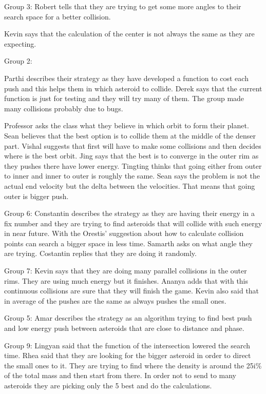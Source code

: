 Group 3:
Robert tells that they are trying to get some more angles to their search space for a better collision.

Kevin says that the calculation of the center is not always the same as they are expecting.

Group 2:

Parthi describes their strategy as they have developed a function to cost each push and this helps them in which asteroid to collide.
Derek says that the current function is just for testing and they will try many of them.
The group made many collisions probably due to bugs.
 
Professor asks the class what they believe in which orbit to form their planet.
Sean believes that the best option is to collide them at the middle of the denser part.
Vishal suggests that first will have to make some collisions and then decides where is the best orbit.
Jing says that the best is to converge in the outer rim as they pushes there have lower energy.
Tingting thinks that going either from outer to inner and inner to outer is roughly the same.
Sean says the problem is not the actual end velocity but the delta between the velocities.
That means that going outer is bigger push.

Group 6:
Constantin describes the strategy as they are having their energy in a fix number and they are trying to find asteroids that will collide with such energy in near future. With the Orestis’ suggestion about how to calculate collision points can search a bigger space in less time.
Samarth asks on what angle they are trying.
Costantin replies that they are doing it randomly.



Group 7:
Kevin says that they are doing many parallel collisions in the outer rims. They are using much energy but it finishes. 
Ananya adds that with this continuous collisions are sure that they will finish the game.
Kevin also said that in average of the pushes are the same as always pushes the small ones.

Group 5:
Amar describes the strategy as an algorithm trying to find best push and low energy push between asteroids that are close to distance and phase.

Group 9:
Lingyan said that the function of the intersection lowered the search time. 
Rhea said that they are looking for the bigger asteroid in order to direct the small ones to it.
They are trying to find where the density is around the 25i\% of the total mass and then start from there. In order not to send to many asteroids they are picking only the 5 best and do the calculations. 

